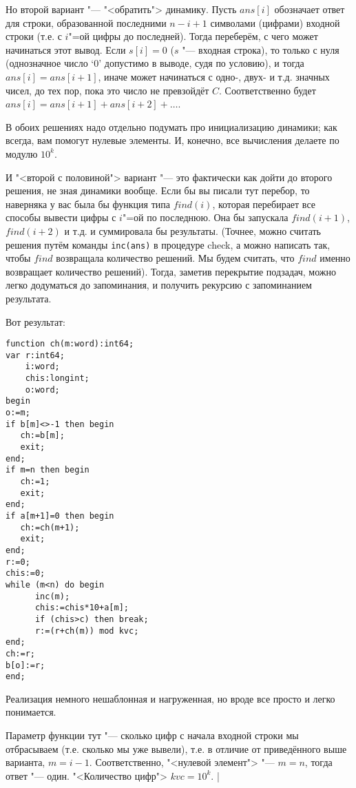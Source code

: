 Но второй вариант "--- "<обратить"> динамику. Пусть $ans[i]$ обозначает ответ для строки, 
образованной последними $n-i+1$ символами (цифрами) входной строки (т.е. с $i$"=ой цифры до 
последней). Тогда переберём, с чего может начинаться этот вывод. Если $s[i]=0$ ($s$ "--- входная 
строка), то только с нуля (однозначное число `0' допустимо в выводе, судя по условию), и тогда 
$ans[i]=ans[i+1]$, иначе может начинаться с одно-, двух- и т.д. значных чисел, до тех пор, пока это 
число не превзойдёт $C$. Соответственно будет $ans[i]=ans[i+1]+ans[i+2]+\dots$.

В обоих решениях надо отдельно подумать про инициализацию динамики; как всегда, вам помогут нулевые 
элементы. И, конечно, все вычисления делаете по модулю $10^k$.

И "<второй с половиной"> вариант "--- это фактически как дойти до второго решения, не зная динамики 
вообще. Если бы вы писали тут перебор, то наверняка у вас была бы функция типа $find(i)$, которая 
перебирает все способы вывести цифры с $i$"=ой по последнюю. Она бы запускала $find(i+1)$, 
$find(i+2)$ и т.д. и суммировала бы результаты. (Точнее, можно считать решения путём команды 
\texttt{inc(ans)} в процедуре check, а можно написать так, чтобы $find$ возвращала количество 
решений. Мы будем считать, что $find$ именно возвращает количество решений). Тогда, заметив 
перекрытие подзадач, можно легко додуматься до запоминания, и получить рекурсию с запоминанием 
результата.


Вот результат:
\begin{codesample}\begin{verbatim}
function ch(m:word):int64;
var r:int64;
    i:word;
    chis:longint;
    o:word;
begin
o:=m;
if b[m]<>-1 then begin
   ch:=b[m];
   exit;
end;
if m=n then begin
   ch:=1;
   exit;
end;
if a[m+1]=0 then begin
   ch:=ch(m+1);
   exit;
end;
r:=0;
chis:=0;
while (m<n) do begin
      inc(m);
      chis:=chis*10+a[m];
      if (chis>c) then break;
      r:=(r+ch(m)) mod kvc;
end;
ch:=r;
b[o]:=r;
end;
\end{verbatim}
\end{codesample}
Реализация немного нешаблонная и нагруженная, но вроде все просто и легко понимается.
 
 Параметр функции 
тут "--- сколько цифр с начала входной строки мы отбрасываем (т.е. сколько мы уже вывели), т.е. в 
отличие от приведённого выше варианта, $m=i-1$. Соответственно, "<нулевой элемент"> "--- $m=n$, 
тогда ответ "--- один. "<Количество цифр"> $kvc=10^k$.
|

